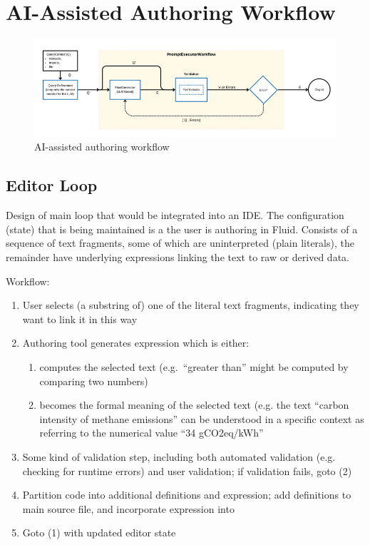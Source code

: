 \section{AI-Assisted Authoring Workflow}
\label{sec:authoring-workflow}

\begin{figure}
    \centering
    \includegraphics[width=0.95\linewidth]{fig/authoring-assistant-architecture.png}
    \caption{AI-assisted authoring workflow}\label{fig:architecture}
\end{figure}

\subsection{Editor Loop}\label{subsec:editor-loop}
Design of main loop that would be integrated into an IDE. The configuration (state) that is being maintained
is a  the user is authoring in Fluid. Consists of a sequence of text fragments, some of which
are uninterpreted (plain literals), the remainder have underlying expressions linking the text to raw or derived
data.

Workflow:
\begin{enumerate}
\item User selects (a substring of) one of the literal text fragments, indicating they want to link it in this
way
\item Authoring tool generates expression which is either:
  \begin{enumerate}
  \item computes the selected text (e.g.~``greater than'' might be computed by comparing two numbers)
  \item becomes the formal meaning of the selected text (e.g. the text ``carbon intensity of methane
emissions'' can be understood in a specific context as referring to the numerical value ``34 gCO2eq/kWh''
  \end{enumerate}
\item Some kind of validation step, including both automated validation (e.g. checking for runtime errors) and
user validation; if validation fails, goto (2)
\item Partition code into additional definitions and expression; add definitions to main source file, and
incorporate expression into 
\item Goto (1) with updated editor state
\end{enumerate}

